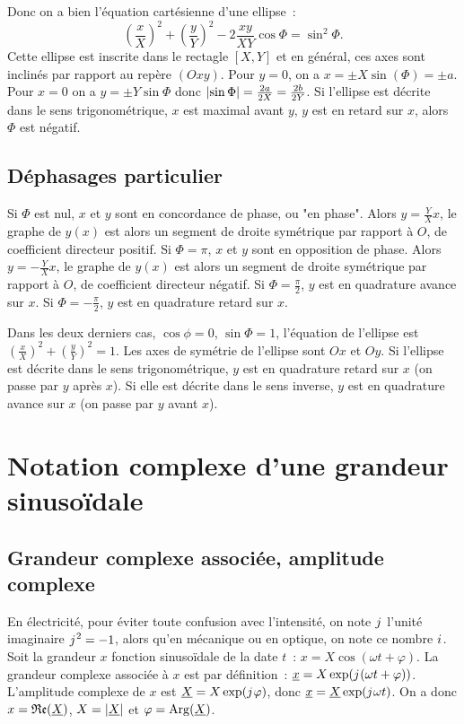             Donc on a bien l'équation cartésienne d'une ellipse~:
            \begin{equation}
                \left(\frac{x}{X}\right)^2 + \left(\frac{y}{Y}\right)^2 - 2 \frac{xy}{XY} \cos\Phi = \sin^2\Phi.
            \end{equation}
            Cette ellipse est inscrite dans le rectagle $[X, Y]$ et en général, ces axes sont inclinés par rapport au repère $(Oxy)$. Pour $y=0$, on a $x = \pm X\sin(\Phi) = \pm a$. Pour $x=0$ on a $y = \pm Y\sin\Phi$ donc $\left\lvert\sin\Phi\right\rvert = \frac{2a}{2X} = \frac{2b}{2Y}$. Si l'ellipse est décrite dans le sens trigonométrique, $x$ est maximal avant $y$, $y$ est en retard sur $x$, alors $\Phi$ est négatif.
        \subsection{Déphasages particulier}
            Si $\Phi$ est nul, $x$ et $y$ sont en concordance de phase, ou "en phase". Alors $y=\frac{Y}{X} x$, le graphe de $y(x)$ est alors un segment de droite symétrique par rapport à $O$, de coefficient directeur positif. Si $\Phi=\pi$, $x$ et $y$ sont en opposition de phase. Alors $y=-\frac{Y}{X} x$, le graphe de $y(x)$ est alors un segment de droite symétrique par rapport à $O$, de coefficient directeur négatif. Si $\Phi=\frac{\pi}{2}$, $y$ est en quadrature avance sur $x$. Si $\Phi=-\frac{\pi}{2}$, $y$ est en quadrature retard sur $x$.

            Dans les deux derniers cas, $\cos\phi = 0$, $\sin\Phi=1$, l'équation de l'ellipse est $\left(\frac{x}{X}\right)^2 + \left(\frac{y}{Y}\right)^2 = 1$. Les axes de symétrie de l'ellipse sont $Ox$ et $Oy$. Si l'ellipse est décrite dans le sens trigonométrique, $y$ est en quadrature retard sur $x$ (on passe par $y$ après $x$). Si elle est décrite dans le sens inverse, $y$ est en quadrature avance sur $x$ (on passe par $y$ avant $x$).
\section{Notation complexe d'une grandeur sinusoïdale}
    \label{sec:complexe}
    \subsection{Grandeur complexe associée, amplitude complexe}
        En électricité, pour éviter toute confusion avec l'intensité, on note ${j\mkern1mu}$ l'unité imaginaire ${j\mkern1mu}^2=-1$, alors qu'en mécanique ou en optique, on note ce nombre ${i\mkern1mu}$. Soit la grandeur $x$ fonction sinusoïdale de la date $t$~: $x = X\cos(\omega t +\varphi)$. La grandeur complexe associée à $x$ est par définition~: $\underline{x} = X\exp({j\mkern1mu}(\omega t +\varphi))$. L'amplitude complexe de $x$ est $\underline{X} = X\exp({j\mkern1mu} \varphi)$, donc $\underline{x} = \underline{X} \exp({j\mkern1mu}\omega t)$. On a donc $x = \mathfrak{Re}(\underline{X})$, $X = \left\lvert\underline{X}\right\rvert$ et $\varphi = \operatorname{Arg}(\underline{X})$.
